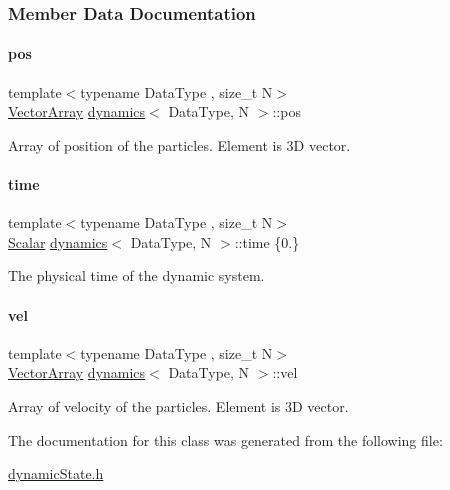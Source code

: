 \subsubsection{Member Data Documentation}
\mbox{\label{classdynamics_a79f983dcbf7107058280f798ab419b69}} 
\paragraph{\texorpdfstring{pos}{pos}}
{\footnotesize\ttfamily template$<$typename Data\+Type , size\+\_\+t N$>$ \\
\mbox{\hyperlink{classdynamics_a41e25703d6668a66d96a1db3dc5df03b}{Vector\+Array}} \mbox{\hyperlink{classdynamics}{dynamics}}$<$ Data\+Type, N $>$\+::pos}



Array of position of the particles. Element is 3D vector. 

\mbox{\label{classdynamics_a95cb1723922c4224bf5d1118eed46c0c}} 
\paragraph{\texorpdfstring{time}{time}}
{\footnotesize\ttfamily template$<$typename Data\+Type , size\+\_\+t N$>$ \\
\mbox{\hyperlink{classdynamics_a444c7534e86115117798563cb0e43cde}{Scalar}} \mbox{\hyperlink{classdynamics}{dynamics}}$<$ Data\+Type, N $>$\+::time \{0.\}}



The physical time of the dynamic system. 

\mbox{\label{classdynamics_a211067eb96b01c17d2fc73d1fc65d595}} 
\paragraph{\texorpdfstring{vel}{vel}}
{\footnotesize\ttfamily template$<$typename Data\+Type , size\+\_\+t N$>$ \\
\mbox{\hyperlink{classdynamics_a41e25703d6668a66d96a1db3dc5df03b}{Vector\+Array}} \mbox{\hyperlink{classdynamics}{dynamics}}$<$ Data\+Type, N $>$\+::vel}



Array of velocity of the particles. Element is 3D vector. 



The documentation for this class was generated from the following file\+:\begin{DoxyCompactItemize}
\item 
\mbox{\hyperlink{dynamic_state_8h}{dynamic\+State.\+h}}\end{DoxyCompactItemize}
